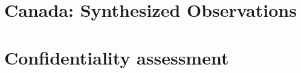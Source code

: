 %
%

\section{Canada: Synthesized Observations}
\label{sec:synth_obs}



\section{Confidentiality assessment}
\label{sec:conf:appendix}






